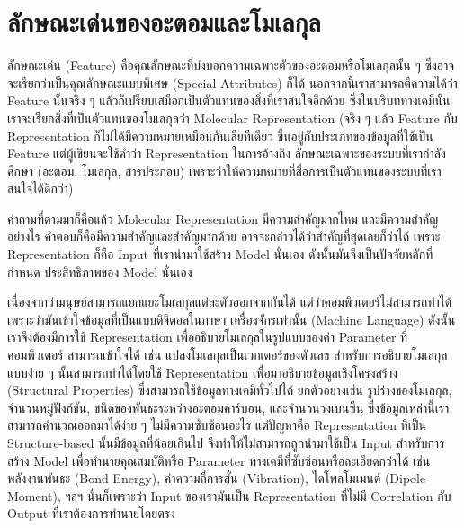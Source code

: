 

\chapter{ลักษณะเด่นของอะตอมและโมเลกุล}
\label{ch:feature}

ลักษณะเด่น (Feature) คือคุณลักษณะที่บ่งบอกความเฉพาะตัวของอะตอมหรือโมเลกุลนั้น ๆ ซึ่งอาจจะเรียกว่าเป็นคุณลักษณะแบบพิเศษ 
(Special Attributes) ก็ได้ นอกจากนี้เราสามารถตีความได้ว่า Feature นั้นจริง ๆ แล้วก็เปรียบเสมือกเป็นตัวแทนของสิ่งที่เราสนใจอีกด้วย 
ซึ่งในบริบททางเคมีนั้น เราจะเรียกสิ่งที่เป็นตัวแทนของโมเลกุลว่า Molecular Representation (จริง ๆ แล้ว Feature กับ Representation 
ก็ไม่ได้มีความหมายเหมือนกันเสียทีเดียว ขึ้นอยู่กับประเภทของข้อมูลที่ใช้เป็น Feature แต่ผู้เขียนจะใช้คำว่า Representation ในการอ้างถึง%
ลักษณะเฉพาะของระบบที่เรากำลังศึกษา (อะตอม, โมเลกุล, สารประกอบ) เพราะว่าให้ความหมายที่สื่อการเป็นตัวแทนของระบบที่เราสนใจได้ดีกว่า)
\cite{stepisnik2021}

คำถามที่ตามมาก็คือแล้ว Molecular Representation มีความสำคัญมากไหม และมีความสำคัญอย่างไร คำตอบก็คือมีความสำคัญและสำคัญมากด้วย 
อาจจะกล่าวได้ว่าสำคัญที่สุดเลยก็ว่าได้ เพราะ Representation ก็คือ Input ที่เรานำมาใช้สร้าง Model นั่นเอง ดังนั้นมันจึงเป็นปัจจัยหลักที่กำหนด%
ประสิทธิภาพของ Model นั่นเอง 

เนื่องจากว่ามนุษย์สามารถแยกแยะโมเลกุลแต่ละตัวออกจากกันได้ แต่ว่าคอมพิวเตอร์ไม่สามารถทำได้ เพราะว่ามันเข้าใจข้อมูลที่เป็นแบบดิจิตอลในภาษา%
เครื่องจักรเท่านั้น (Machine Language) ดังนั้นเราจึงต้องมีการใช้ Representation เพื่ออธิบายโมเลกุลในรูปแบบของค่า Parameter ที่คอมพิวเตอร์%
สามารถเข้าใจได้ เช่น แปลงโมเลกุลเป็นเวกเตอร์ของตัวเลข สำหรับการอธิบายโมเลกุลแบบง่าย ๆ นั้นสามารถทำได้โดยใช้ Representation 
เพื่อมาอธิบายข้อมูลเชิงโครงสร้าง (Structural Properties) ซึ่งสามารถใช้ข้อมูลทางเคมีทั่วไปได้ ยกตัวอย่างเช่น รูปร่างของโมเลกุล, 
จำนวนหมู่ฟังก์ชัน, ชนิดของพันธะระหว่างอะตอมคาร์บอน, และจำนวนวงเบนซีน ซึ่งข้อมูลเหล่านี้เราสามารถคำนวณออกมาได้ง่าย ๆ ไม่มีความซับซ้อนอะไร 
แต่ปัญหาคือ Representation ที่เป็น Structure-based นั้นมีข้อมูลที่น้อยเกินไป จึงทำให้ไม่สามารถถูกนำมาใช้เป็น Input สำหรับการสร้าง Model 
เพื่อทำนายคุณสมบัติหรือ Parameter ทางเคมีที่ซับซ้อนหรือละเอียดกว่าได้ 
เช่น พลังงานพันธะ (Bond Energy), ค่าความถี่การสั่น (Vibration), ไดโพลโมเมนต์ (Dipole Moment), ฯลฯ นั่นก็เพราะว่า Input 
ของเรามันเป็น Representation ที่ไม่มี Correlation กับ Output ที่เราต้องการทำนายโดยตรง


